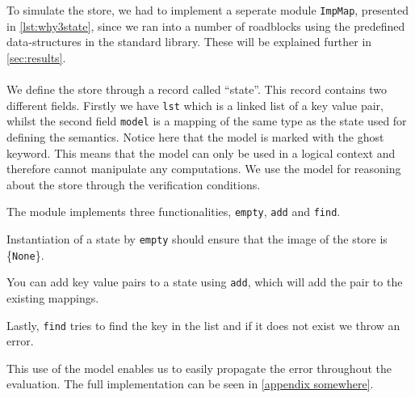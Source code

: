To simulate the store, we had to implement a seperate module \texttt{ImpMap}, presented in \autoref{lst:why3state},
since we ran into a number of roadblocks using the predefined data-structures in the standard library.
These will be explained further in \ref{sec:results}.
\\~\\
We define the store through a record called ``state''.
This record contains two different fields.
Firstly we have \texttt{lst} which is a linked list of a key value pair,
whilst the second field \texttt{model} is a mapping of the same type as the state used for defining the semantics.
Notice here that the model is marked with the ghost keyword. This means that the model can only be used in a logical context
and therefore cannot manipulate any computations.
We use the model for reasoning about the store through the verification conditions.

The module implements three functionalities, \texttt{empty}, \texttt{add} and \texttt{find}.

Instantiation of a state by \texttt{empty} should ensure that the image of the store is \{\texttt{None}\}.

You can add key value pairs to a state using \texttt{add}, which will add the pair to the existing mappings.

Lastly, \texttt{find} tries to find the key in the list and if it does not exist we throw an error.

This use of the model enables us to easily propagate the error throughout the evaluation.
The full implementation can be seen in \autoref{appendix somewhere}.








